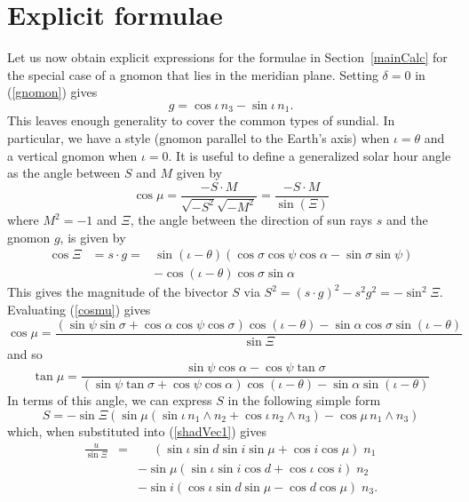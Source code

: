 \documentclass[12pt]{article}
\newcommand{\nn}{\nonumber}
\newcommand{\wdg}{\! \wedge \!}
\begin{document}
\section{Explicit formulae} \label{specCalc}
%
Let us now obtain explicit expressions for the formulae in Section~\ref{mainCalc} for the special case of a gnomon that lies in the meridian plane. Setting $\delta = 0$ in (\ref{gnomon}) gives
%
\begin{equation}
g = \cos\iota \, n_3 - \sin\iota \, n_1.
\end{equation}
%
This leaves enough generality to cover the common types of sundial. In particular, we have a style (gnomon parallel to the Earth's axis) when $\iota = \theta$ and a vertical gnomon when $\iota = 0$. It is useful to define a generalized solar hour angle as the angle between $S$ and $M$ given by
%
\begin{equation} \label{cosmu}
\cos\mu = \frac{-S\cdot M}{\sqrt{-S^2}\sqrt{-M^2}} = \frac{-S\cdot M}{\sin(\Xi)}
\end{equation}
%
where $M^2 = -1$ and $\Xi$, the angle between the direction of sun rays $s$ and the gnomon $g$, is given by
%
\begin{eqnarray}
\cos\Xi & = s\cdot g = & \sin(\iota-\theta)(\cos\sigma\cos\psi\cos\alpha - \sin\sigma\sin\psi) \\ \nn
        && - \cos(\iota-\theta)\cos\sigma\sin\alpha
\end{eqnarray}
%
This gives the magnitude of the bivector $S$ via $S^2 = (s\cdot g)^2 - s^2 g^2 = -\sin^2\Xi$. Evaluating (\ref{cosmu}) gives
\begin{equation} \label{cosHourAngle}
  \cos\mu = \frac{(\sin\psi\sin\sigma+\cos\alpha\cos\psi\cos\sigma)\cos(\iota-\theta)-\sin\alpha\cos\sigma\sin(\iota-\theta)}{\sin\Xi}
\end{equation}  
%
and so
%
\begin{equation} \label{hourAngle}
\tan\mu = \frac{\sin\psi\cos\alpha-\cos\psi\tan\sigma}{( \sin\psi\tan\sigma+\cos\psi\cos\alpha )\cos(\iota-\theta) - \sin\alpha\sin(\iota-\theta) }
\end{equation}
%
In terms of this angle, we can express $S$ in the following simple form
%
\begin{equation} \label{SBetter}
S = -\sin\Xi ( \sin\mu( \sin\iota \, n_1 \wdg n_2 + \cos\iota \, n_2 \wdg n_3 ) - \cos\mu \, n_1 \wdg n_3 )
\end{equation}
%
which, when substituted into (\ref{shadVec1}) gives
%
\begin{eqnarray} \label{shadBetter}
\frac{u}{\sin\Xi} & = & \phantom{-}( \sin\iota\sin d \sin i \sin\mu + \cos i \cos\mu ) \; n_1 \\ \nn
& & - \sin\mu ( \sin\iota\sin i \cos d + \cos\iota\cos i) \; n_2 \\ \nn
& & - \sin i (\cos\iota\sin d \sin\mu - \cos d\cos\mu) \; n_3.
\end{eqnarray}
\end{document}
